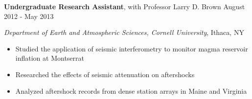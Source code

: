 
\vspace{7pt}

\textbf{Undergraduate Research Assistant}, with Professor Larry D. Brown \hfill August 2012 - May 2013

\textit{Department of Earth and Atmospheric Sciences, Cornell University}, Ithaca, NY

\begin{itemize}
    \item Studied the application of seismic interferometry to monitor magma reservoir inflation at Montserrat
    \item Researched the effects of seismic attenuation on aftershocks
    \item Analyzed aftershock records from dense station arrays in Maine and Virginia
\end{itemize}
